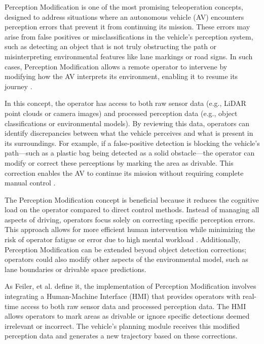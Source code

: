 Perception Modification is one of the most promising teleoperation
concepts, designed to address situations where an autonomous
vehicle (AV) encounters perception errors that prevent it
from continuing its mission. These errors may arise from false
positives or misclassifications in the vehicle's perception system,
such as detecting an object that is not truly obstructing the path or
misinterpreting environmental features like lane markings or road signs.
In such cases, Perception Modification allows a remote operator to
intervene by modifying how the AV interprets its environment,
enabling it to resume its journey \cite{feiler2023perception}.

In this concept, the operator has access to both raw sensor data
(e.g., LiDAR point clouds or camera images) and processed perception
data (e.g., object classifications or environmental models).
By reviewing this data, operators can identify discrepancies
between what the vehicle perceives and what is present in its
surroundings. For example, if a false-positive detection is blocking
the vehicle's path—such as a plastic bag being detected as a solid
obstacle—the operator can modify or correct these perceptions by
marking the area as drivable. This correction enables the AV to
continue its mission without requiring complete manual control \cite{feiler2023perception}.

The Perception Modification concept is beneficial because
it reduces the cognitive load on the operator compared to direct control methods.
Instead of managing all aspects of driving, operators focus solely on correcting
specific perception errors. This approach allows for more efficient human
intervention while minimizing the risk of operator fatigue or error due to
high mental workload \cite{Brecht}. Additionally, Perception Modification can
be extended beyond object detection corrections; operators could also modify other
aspects of the environmental model, such as lane boundaries or drivable space predictions.

As Feiler, et al. \cite{feiler2023perception} define it, the implementation of
Perception Modification involves integrating a  Human-Machine Interface (HMI) that provides operators with real-time access to both raw sensor data and processed perception data. The HMI allows operators to
mark areas as drivable or ignore specific detections deemed irrelevant or incorrect. The vehicle's planning module receives this modified perception data and generates a new trajectory based on these corrections.

